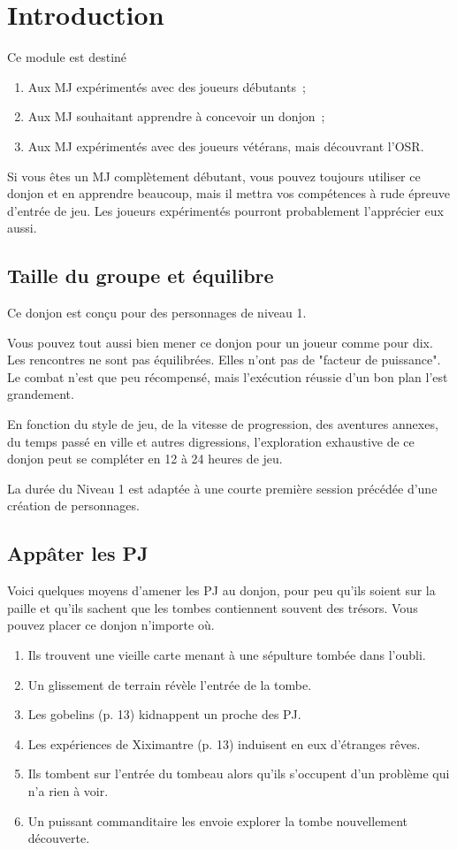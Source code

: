 \chapter{Introduction}
Ce module est destiné
\begin{enumerate}
  \item Aux MJ expérimentés avec des joueurs débutants~;
  \item Aux MJ souhaitant apprendre à concevoir un donjon~;
  \item Aux MJ expérimentés avec des joueurs vétérans, mais découvrant l'OSR.
\end{enumerate}
Si vous êtes un MJ complètement débutant, vous pouvez toujours utiliser ce donjon et en apprendre beaucoup, mais il mettra vos compétences à rude épreuve d'entrée de jeu.
Les joueurs expérimentés pourront probablement l'apprécier eux aussi.

\section{Taille du groupe et équilibre}
Ce donjon est conçu pour des personnages de niveau 1.

Vous pouvez tout aussi bien mener ce donjon pour un joueur comme pour dix.
Les rencontres ne sont pas équilibrées.
Elles n'ont pas de "facteur de puissance".
Le combat n'est que peu récompensé, mais l'exécution réussie d'un bon plan l'est grandement.

En fonction du style de jeu, de la vitesse de progression, des aventures annexes, du temps passé en ville et autres digressions, l'exploration exhaustive de ce donjon peut se compléter en 12 à 24 heures de jeu.

La durée du Niveau 1 est adaptée à une courte première session précédée d'une création de personnages.

\section{Appâter les PJ}
Voici quelques moyens d'amener les PJ au donjon, pour peu qu'ils soient sur la paille et qu'ils sachent que les tombes
contiennent souvent des trésors.
Vous pouvez placer ce donjon n'importe où.

\begin{enumerate}
  \item Ils trouvent une vieille carte menant à une sépulture tombée dans l'oubli.
  \item Un glissement de terrain révèle l'entrée de la tombe.
  \item Les gobelins (p. 13) kidnappent un proche des PJ.
  \item Les expériences de Xiximantre (p. 13) induisent en eux d'étranges rêves.
  \item Ils tombent sur l'entrée du tombeau alors qu'ils s'occupent d'un problème qui n'a rien à voir.
  \item Un puissant commanditaire les envoie explorer la tombe nouvellement découverte.
\end{enumerate}